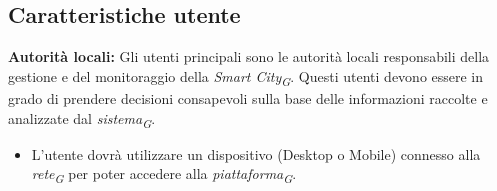 \subsection{Caratteristiche utente}
\textbf{Autorità locali:} Gli utenti principali sono le autorità locali responsabili della gestione e del monitoraggio della \textit{Smart City}\textsubscript{\textit{G}}. Questi utenti devono essere in grado di prendere decisioni consapevoli sulla base delle informazioni raccolte e analizzate dal \textit{sistema}\textsubscript{\textit{G}}.
\begin{itemize}
    \item L'utente dovrà utilizzare un dispositivo (Desktop o Mobile) connesso alla \textit{rete}\textsubscript{\textit{G}} per poter accedere alla \textit{piattaforma}\textsubscript{\textit{G}}.  
\end{itemize}
